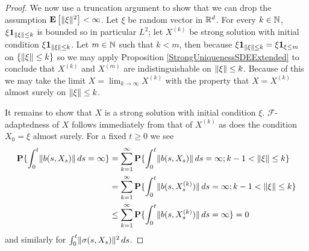 \begin{proof}
We now use a truncation argument to show that we can drop the assumption $\textbf{E}\left[\lVert \xi \rVert^2\right] < \infty$.  Let $\xi$ be random vector in $\mathbb{R}^d$.  For every $k \in \mathbb{N}$, $\xi \textbf{1}_{\lVert \xi \rVert \leq k}$ is bounded so in particular $L^2$; let $X^{(k)}$ be strong solution with initial condition $\xi \textbf{1}_{\lVert \xi \rVert \leq k}$.  Let $m \in \mathbb{N}$ such that $k < m$, then because $\xi \textbf{1}_{\lVert \xi \rVert \leq k} = \xi \textbf{1}_{\xi \leq m}$ on $\lbrace \lVert \xi \rVert \leq k \rbrace$ so we may apply Proposition 
\ref{StrongUniquenessSDEExtended} to conclude that $X^{(k)}$ and $X^{(m)}$ are indistinguishable on $\lVert \xi \rVert \leq k$.  Because of this we may take the limit $X = \lim_{k \to \infty} X^{(k)}$ with the property that $X = X^{(k)}$ almost surely on $\lVert \xi \rVert \leq k$.  

It remains to show that $X$ is a strong solution with initial condition $\xi$.  $\mathcal{F}$-adaptedness of $X$ follows immediately from that of $X^{(k)}$ as does the condition $X_0 = \xi$ almost surely.  For a fixed $t \geq 0$ we see
\begin{align*}
\textbf{P}\{\int_0^t \lVert b(s,X_s) \rVert \, ds = \infty\} &= \sum_{k=1}^\infty \textbf{P}\{\int_0^t \lVert b(s,X_s) \rVert \, ds = \infty; k-1 < \lVert \xi \rVert \leq k\} \\
&= \sum_{k=1}^\infty \textbf{P}\{\int_0^t \lVert b(s,X^{(k)}_s) \rVert \, ds = \infty; k-1 < \lVert \xi \rVert \leq k\} \\
&\leq \sum_{k=1}^\infty \textbf{P}\{\int_0^t \lVert b(s,X^{(k)}_s) \rVert \, ds = \infty\} = 0
\end{align*}
and similarly for $\int_0^t \lVert \sigma(s,X_s) \rVert^2 \, ds$. 


\end{proof}
